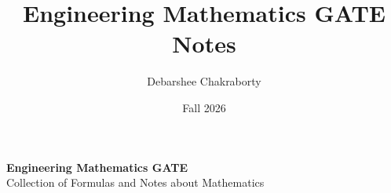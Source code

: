 \documentclass[11pt]{article}
\title{Engineering Mathematics GATE Notes}
\author{Debarshee Chakraborty}
\date{Fall 2026}
\theoremstyle{definition}
\begin{document}
\begin{center}
    {\LARGE \textbf{Engineering Mathematics GATE}} \\
    \Large {Collection of Formulas and Notes about Mathematics}
\end{center}



\end{document}
